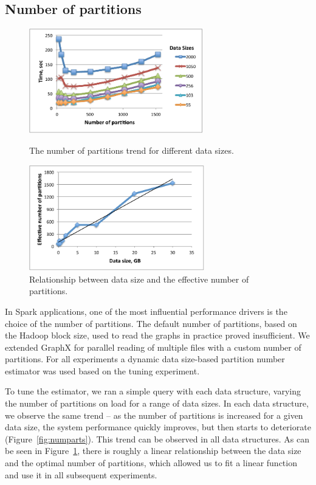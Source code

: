\subsection{Number of partitions}

\begin{figure}[th!]
\centering
\begin{minipage}{3.3in}
  \centering
  \includegraphics[width=3in]{figs/numparts.pdf}
  \caption{The number of partitions trend for different data sizes.}
  \label{fig:numparts}
\end{minipage}
\begin{minipage}{3.3in}
  \centering
  \includegraphics[width=3in]{figs/partsfit.pdf}
  \caption{Relationship between data size and the effective number of
  partitions.}
  \label{fig:partsfit}
\end{minipage}
\end{figure}

In Spark applications, one of the most influential performance drivers
is the choice of the number of partitions.  The default number of
partitions, based on the Hadoop block size, used to read the graphs in
practice proved insufficient.  We extended GraphX for parallel reading
of multiple files with a custom number of partitions.  For all
experiments a dynamic data size-based partition number estimator was
used based on the tuning experiment.

To tune the estimator, we ran a simple  query with each
data structure, varying the number of partitions on load for a range
of data sizes.  In each data structure, we observe the same trend --
as the number of partitions is increased for a given data size, the
system performance quickly improves, but then starts to deteriorate
(Figure~\ref{fig:numparts}).  This trend can be observed in all data
structures.  As can be seen in Figure~\ref{fig:partsfit}, there is
roughly a linear relationship between the data size and the optimal
number of partitions, which allowed us to fit a linear function and
use it in all subsequent experiments.

